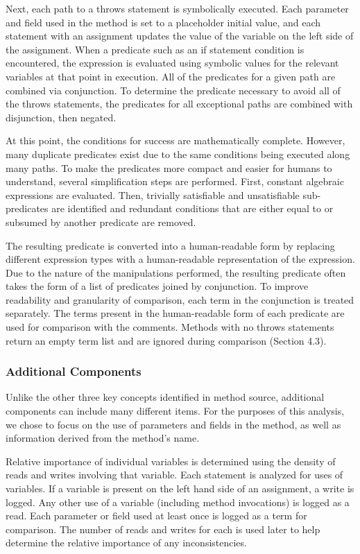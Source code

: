 \documentclass[preprint]{sigplanconf}
\begin{document}
Next, each path to a throws statement is symbolically executed. Each parameter and field used in the method is set to a placeholder initial value, and each statement with an assignment updates the value of the variable on the left side of the assignment. When a predicate such as an if statement condition is encountered, the expression is evaluated using symbolic values for the relevant variables at that point in execution. All of the predicates for a given path are combined via conjunction. To determine the predicate necessary to avoid all of the throws statements, the predicates for all exceptional paths are combined with disjunction, then negated.

At this point, the conditions for success are mathematically complete. However, many duplicate predicates exist due to the same conditions being executed along many paths. To make the predicates more compact and easier for humans to understand, several simplification steps are performed. First, constant algebraic expressions are evaluated. Then, trivially satisfiable and unsatisfiable sub-predicates are identified and redundant conditions that are either equal to or subsumed by another predicate are removed.

The resulting predicate is converted into a human-readable form by replacing different expression types with a human-readable representation of the expression. Due to the nature of the manipulations performed, the resulting predicate often takes the form of a list of predicates joined by conjunction. To improve readability and granularity of comparison, each term in the conjunction is treated separately. The terms present in the human-readable form of each predicate are used for comparison with the comments. Methods with no throws statements return an empty term list and are ignored during comparison (Section 4.3).

\subsubsection{Additional Components}
Unlike the other three key concepts identified in method source, additional components can include many different items. For the purposes of this analysis, we chose to focus on the use of parameters and fields in the method, as well as information derived from the method's name.

Relative importance of individual variables is determined using the density of reads and writes involving that variable. Each statement is analyzed for uses of variables. If a variable is present on the left hand side of an assignment, a write is logged. Any other use of a variable (including method invocations) is logged as a read. Each parameter or field used at least once is logged as a term for comparison. The number of reads and writes for each is used later to help determine the relative importance of any inconsistencies.
\end{document}
